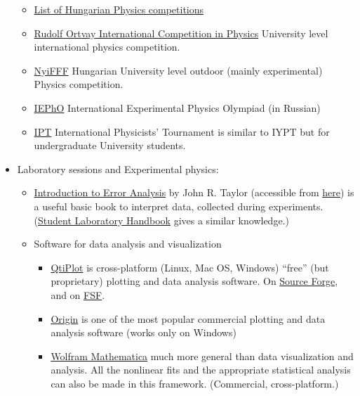 \documentclass{article}
\begin{document}
\begin{itemize}
\begin{itemize}
\item \href{http://web.archive.org/web/20200318012748/http://fizika.fazekas.hu/index.php/2019/10/01/201920-as-tanev-versenyei-fizikabol/}{List of Hungarian Physics competitions}

\item \href{https://ortvay.elte.hu/main.html}{Rudolf Ortvay International Competition in Physics} University level international physics competition.


\item \href{http://nyifff.elte.hu/}{NyiFFF} Hungarian University level outdoor (mainly experimental) Physics competition.

\item \href{http://iepho.ru/}{IEPhO} International Experimental Physics Olympiad (in Russian)

\item \href{https://iptnet.info/}{IPT} International Physicists' Tournament is similar to IYPT but for undergraduate University students.
\end{itemize}

\item Laboratory sessions and Experimental physics:

\begin{itemize}
\item \href{https://www.goodreads.com/book/show/1017766.Introduction_to_Error_Analysis}{Introduction to Error Analysis} by John R. Taylor (accessible from
\href{https://web.archive.org/web/20200318010340/http://hep.ucsb.edu/courses/ph128_18s/Taylor.pdf}{here}) is a useful basic book to interpret data, collected during experiments. (\href{https://web.archive.org/web/20190801072249/http://www2.phy.ilstu.edu/~wenning/slh/}{Student Laboratory Handbook} gives a similar knowledge.)

\item Software for data analysis and visualization
\begin{itemize}
    \item \href{https://www.qtiplot.com/index.html}{QtiPlot} is cross-platform (Linux, Mac OS, Windows) ``free'' (but proprietary) plotting and data analysis software. On \href{https://sourceforge.net/projects/qtiplot.berlios/}{Source Forge}, and on \href{https://directory.fsf.org/wiki/Qtiplot}{FSF}.
    \item \href{https://www.originlab.com/}{Origin} is one of the most popular commercial plotting and data analysis software (works only on Windows)
    \item \href{https://www.wolfram.com/mathematica/}{Wolfram Mathematica} much more general than data visualization and analysis. All the nonlinear fits and the appropriate statistical analysis can also be made in this framework. (Commercial, cross-platform.)
\end{itemize}


\end{itemize}
\end{itemize}
\end{document}
